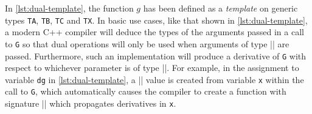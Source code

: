 In \ref{lst:dual-template}, the function \(g\) has been defined as
a \emph{template} on generic types \texttt{TA}, \texttt{TB}, \texttt{TC}
and \texttt{TX}. In basic use cases, like that shown in
\ref{lst:dual-template}, a modern C++ compiler will deduce the
types of the arguments passed in a call to \texttt{G} so that dual
operations will only be used when arguments of type
\VERB|| are passed. Furthermore, such an
implementation will produce a derivative of \texttt{G} with respect to
whichever parameter is of type \VERB||. For example,
in the assignment to variable \texttt{dg} in
\ref{lst:dual-template}, a \VERB|| value is
created from variable \texttt{x} within the call to \texttt{G}, which
automatically causes the compiler to create a function with signature
\VERB|\OperatorTok{(*)(}\OperatorTok{,}\OperatorTok{,}\OperatorTok{,}\OperatorTok{)}|
which propagates derivatives in \texttt{x}.


\hypertarget{lst:dual-template}{%
\label{lst:dual-template}}%
\begin{Shaded}
\begin{Highlighting}[]
\OperatorTok{\textless{}}\OperatorTok{,}\OperatorTok{,} \OperatorTok{,} \OperatorTok{\textgreater{}}
\OperatorTok{(}\OperatorTok{,}\OperatorTok{,}\OperatorTok{,}\OperatorTok{)\{}
\OperatorTok{(}\OperatorTok{*}\OperatorTok{);}
\OperatorTok{(}\OperatorTok{{-}}\OperatorTok{);}
  \OperatorTok{*}\OperatorTok{+} \OperatorTok{(}\OperatorTok{{-}}\OperatorTok{)} \OperatorTok{*}\OperatorTok{;}
\OperatorTok{\}}

\OperatorTok{(}\OperatorTok{,}  \OperatorTok{**}\OperatorTok{)\{}
  \OperatorTok{=} \OperatorTok{,}\OperatorTok{=}\OperatorTok{,}\OperatorTok{=}\OperatorTok{;}
  \OperatorTok{=} \OperatorTok{;}
  \OperatorTok{=}\OperatorTok{(}\OperatorTok{,}\OperatorTok{,}\OperatorTok{,}\OperatorTok{);}
  \OperatorTok{=}\OperatorTok{(}\OperatorTok{(}\OperatorTok{,}\OperatorTok{),}\OperatorTok{,}\OperatorTok{,}\OperatorTok{);}
\OperatorTok{(}\OperatorTok{);}
\OperatorTok{\}}
\end{Highlighting}
\end{Shaded}

